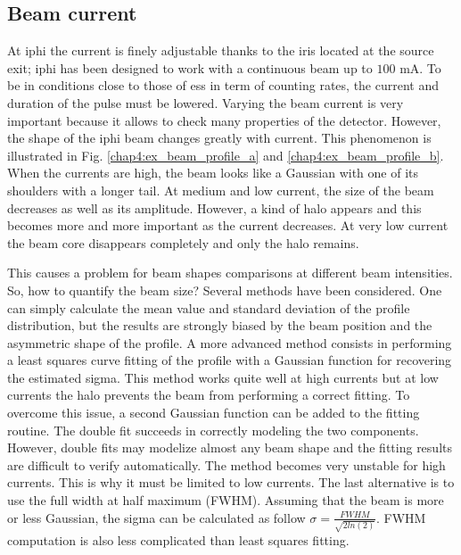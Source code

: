 \begin{refsection}
  \subsection{Beam current}
  \label{chap4:sec:current}
  At \acrshort{iphi} the current is finely adjustable thanks to the iris located at the source exit; \acrshort{iphi} has been designed to work with a continuous beam up to $100$ $\mathrm{mA}$. To be in conditions close to those of \acrshort{ess} in term of counting rates, the current and duration of the pulse must be lowered. Varying the beam current is very important because it allows to check many properties of the detector. However, the shape of the \acrshort{iphi} beam changes greatly with current. This phenomenon is illustrated in Fig. \ref{chap4:ex_beam_profile_a} and \ref{chap4:ex_beam_profile_b}. When the currents are high, the beam looks like a Gaussian with one of its shoulders with a longer tail. At medium and low current, the size of the beam decreases as well as its amplitude. However, a kind of halo appears and this becomes more and more important as the current decreases. At very low current the beam core disappears completely and only the halo remains.

  

  This causes a problem for beam shapes comparisons at different beam intensities. So, how to quantify the beam size? Several methods have been considered. One can simply calculate the mean value and standard deviation of the profile distribution, but the results are strongly biased by the beam position and the asymmetric shape of the profile. A more advanced method consists in performing a least squares curve fitting of the profile with a Gaussian function for recovering the estimated sigma. This method works quite well at high currents but at low currents the halo prevents the beam from performing a correct fitting. To overcome this issue, a second Gaussian function can be added to the fitting routine. The double fit succeeds in correctly modeling the two components. However, double fits may modelize almost any beam shape and the fitting results are difficult to verify automatically. The method becomes very unstable for high currents. This is why it must be limited to low currents. The last alternative is to use the full width at half maximum (FWHM). Assuming that the beam is more or less Gaussian, the sigma can be calculated as follow $\sigma = \frac{FWHM}{\sqrt{2ln(2)}}$. FWHM computation is also less complicated than least squares fitting.


\end{refsection}

